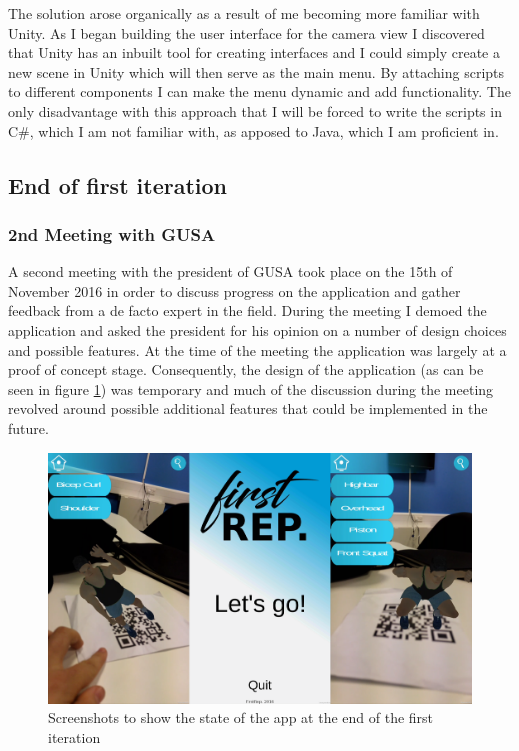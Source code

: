 \documentclass{l4proj}
\begin{document}
The solution arose organically as a result of me becoming more familiar with Unity. As I began building the user interface for the camera view I discovered that Unity has an inbuilt tool for creating interfaces and I could simply create a new scene in Unity which will then serve as the main menu. By attaching scripts to different components I can make the menu dynamic and add functionality. The only disadvantage with this approach that I will be forced to write the scripts in C\#, which I am not familiar with, as apposed to Java, which I am proficient in. 


\subsection{End of first iteration}
\subsubsection{2nd Meeting with GUSA}
A second meeting with the president of GUSA took place on the 15th of November 2016 in order to discuss progress on the application and gather feedback from a de facto expert in the field. During the meeting I demoed the application and asked the president for his opinion on a number of design choices and possible features. At the time of the meeting the application was largely at a proof of concept stage. Consequently, the design of the application (as can be seen in figure \ref{fig:it1}) was temporary and much of the discussion during the meeting revolved around possible additional features that could be implemented in the future. 

\begin{figure}[h]
\centering
\includegraphics[width=\textwidth]{images/iteration1_screenshots.png}
\caption{Screenshots to show the state of the app at the end of the first iteration}
\label{fig:it1}
\end{figure}
\end{document}
